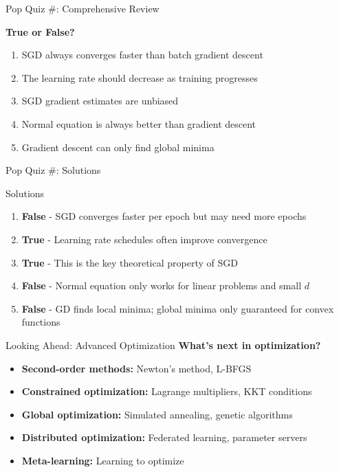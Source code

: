 \documentclass[usenames,dvipsnames]{beamer}
\begin{document}
  \begin{frame}{Pop Quiz \#\thepopquiz: Comprehensive Review}
    \begin{popquizbox}{\thepopquiz}
    \textbf{True or False?}
    \begin{enumerate}
        \item SGD always converges faster than batch gradient descent
        \item The learning rate should decrease as training progresses
        \item SGD gradient estimates are unbiased
        \item Normal equation is always better than gradient descent
        \item Gradient descent can only find global minima
    \end{enumerate}
    \end{popquizbox}
  \end{frame}

  \begin{frame}{Pop Quiz \#\thepopquiz: Solutions}
    \begin{examplebox}{Solutions}
    \begin{enumerate}
        \item \textbf{False} - SGD converges faster per epoch but may need more epochs
        \item \textbf{True} - Learning rate schedules often improve convergence
        \item \textbf{True} - This is the key theoretical property of SGD
        \item \textbf{False} - Normal equation only works for linear problems and small $d$
        \item \textbf{False} - GD finds local minima; global minima only guaranteed for convex functions
    \end{enumerate}
    \end{examplebox}
  \end{frame}

  \begin{frame}{Looking Ahead: Advanced Optimization}
    \textbf{What's next in optimization?}
    
    \begin{itemize}[<+->]
        \item \textbf{Second-order methods:} Newton's method, L-BFGS
        \item \textbf{Constrained optimization:} Lagrange multipliers, KKT conditions  
        \item \textbf{Global optimization:} Simulated annealing, genetic algorithms
        \item \textbf{Distributed optimization:} Federated learning, parameter servers
        \item \textbf{Meta-learning:} Learning to optimize
    \end{itemize}
  \end{frame}
\end{document}
